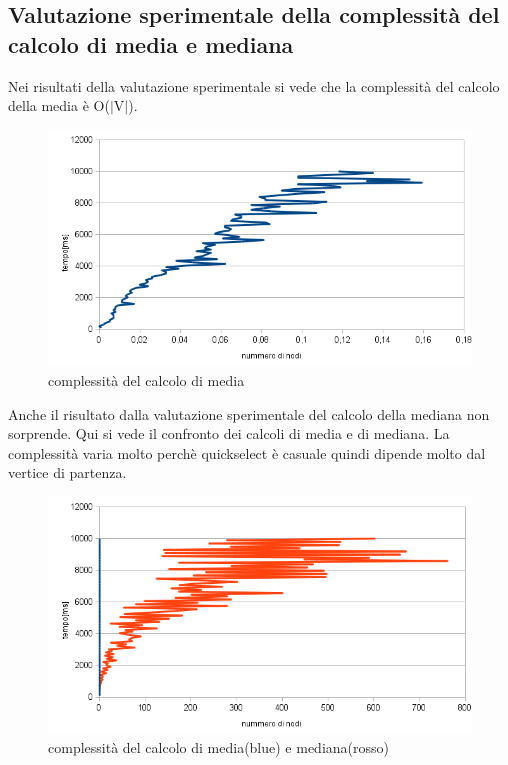 \documentclass[11pt, a4paper, titlepage, block]{article}
\begin{document}
\subsection{Valutazione sperimentale della complessit\`{a} del calcolo di media e mediana}
	Nei risultati della valutazione sperimentale si vede che la complessit\`{a} del calcolo della media \`{e} O($|$V$|$).
	\begin{figure}[htp]
	\centering
	\includegraphics[scale=0.80]{img/calcolo_media.png}
	\caption{complessit\`{a} del calcolo di media}
	\end{figure}
	\newpage
	Anche il risultato dalla valutazione sperimentale del calcolo della mediana non sorprende. Qui si vede il confronto dei calcoli di media e di mediana. 
	La complessit\`{a} varia molto perch\`{e} quickselect \`{e} casuale quindi dipende molto dal vertice di partenza.
	\begin{figure}[htp]
	\centering
	\includegraphics[scale=0.80]{img/calcolo_mediana.png}
	\caption{complessit\`{a} del calcolo di media(blue) e mediana(rosso)}
	\end{figure}
\end{document}

